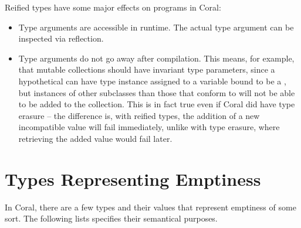 Reified types have some major effects on programs in Coral:
\begin{itemize}

\item Type arguments are accessible in runtime. The actual type argument can be inspected via reflection. 

\item Type arguments do not go away after compilation. This means, for example, that mutable collections should have invariant type parameters, since a hypothetical  can have type instance  assigned to a variable bound to be a , but instances of other subclasses than those that conform to  will not be able to be added to the collection. This is in fact true even if Coral did have type erasure -- the difference is, with reified types, the addition of a new incompatible value will fail immediately, unlike with type erasure, where retrieving the added value would fail later. 
\end{itemize}





\section{Types Representing Emptiness}
\label{sec:emptiness}

In Coral, there are a few types and their values that represent emptiness of some sort. The following lists specifies their semantical purposes. 

